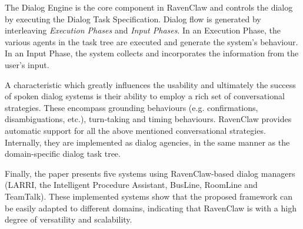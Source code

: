The Dialog Engine is the core component in RavenClaw and controls the dialog by executing the Dialog Task Specification. Dialog flow is generated by interleaving \emph{Execution Phases} and \emph{Input Phases}. In an Execution Phase, the various agents in the task tree are executed and generate the system's behaviour. In an Input Phase, the system collects and incorporates the information from the user's input.

A characteristic which greatly influences the usability and ultimately the success of spoken dialog systems is their ability to employ a rich set of conversational strategies. These encompass grounding behaviours (e.g. confirmations, disambiguations, etc.), turn-taking and timing behaviours. RavenClaw provides automatic support for all the above mentioned conversational strategies. Internally, they are implemented as dialog agencies, in the same manner as the domain-specific dialog task tree.

Finally, the paper presents five systems using RavenClaw-based dialog managers (LARRI, the Intelligent Procedure Assistant, BusLine, RoomLine and TeamTalk). These implemented systems show that the proposed framework can be easily adapted to different domains, indicating that RavenClaw is with a high degree of versatility and scalability.
